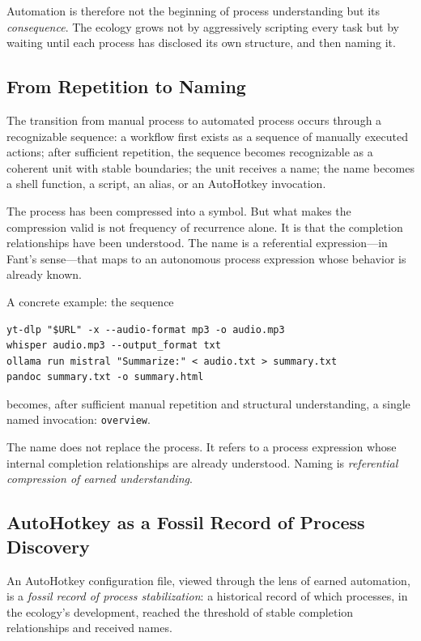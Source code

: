 \documentclass[12pt, a4paper]{article}
\begin{document}
Automation is therefore not the beginning of process understanding
but its \emph{consequence}. The ecology grows not by aggressively
scripting every task but by waiting until each process has disclosed
its own structure, and then naming it.

\subsection{From Repetition to Naming}

The transition from manual process to automated process occurs
through a recognizable sequence: a workflow first exists as a
sequence of manually executed actions; after sufficient repetition,
the sequence becomes recognizable as a coherent unit with stable
boundaries; the unit receives a name; the name becomes a shell
function, a script, an alias, or an AutoHotkey invocation.

The process has been compressed into a symbol. But what makes
the compression valid is not frequency of recurrence alone. It is
that the completion relationships have been understood. The name
is a referential expression---in Fant's sense---that maps to an
autonomous process expression whose behavior is already known.

A concrete example: the sequence

\begin{lstlisting}
yt-dlp "$URL" -x --audio-format mp3 -o audio.mp3
whisper audio.mp3 --output_format txt
ollama run mistral "Summarize:" < audio.txt > summary.txt
pandoc summary.txt -o summary.html
\end{lstlisting}

becomes, after sufficient manual repetition and structural
understanding, a single named invocation: \texttt{overview}.

The name does not replace the process. It refers to a process
expression whose internal completion relationships are already
understood. Naming is \emph{referential compression of earned
understanding}.

\subsection{AutoHotkey as a Fossil Record of Process Discovery}

An AutoHotkey configuration file, viewed through the lens of earned
automation, is a \emph{fossil record of process stabilization}: a
historical record of which processes, in the ecology's development,
reached the threshold of stable completion relationships and received
names.
\end{document}
